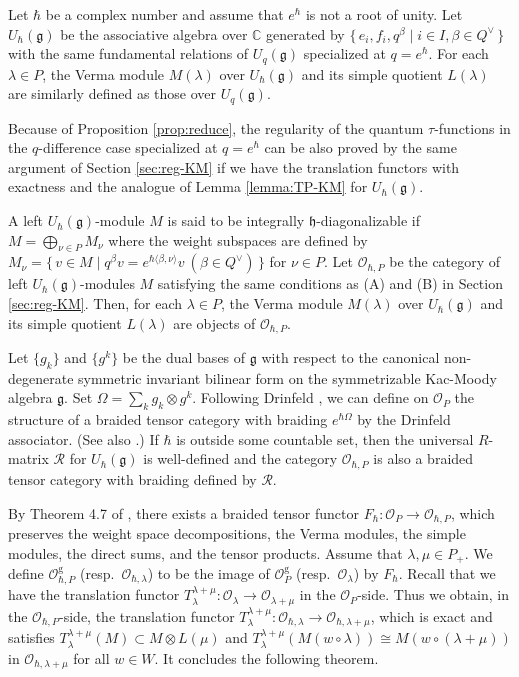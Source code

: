 \documentclass[12pt,twoside]{article}
\newcommand\bra{\langle}
\newcommand\ket{\rangle}
\renewcommand\O{{\mathcal O}}
\newcommand\Qv{Q^\vee}
\newcommand\g{{\mathfrak g}}
\newcommand\h{{\mathfrak h}}
\newcommand\Oh[1]{\O_{\hbar,#1}}
\newcommand\intpart{P}
\newcommand\Oint{\O_\intpart}
\newcommand\Ointh{\O_{\hbar,\intpart}}
\newcommand\Ointg{\Oint^{\mathrm{g}}}
\newcommand\Ointhg{\Ointh^{\mathrm{g}}}
\newcommand\C{{\mathbb C}} %
\theoremstyle{plain} %
\theoremstyle{definition} %
\theoremstyle{definition} %
\numberwithin{theorem}{section}
\numberwithin{equation}{section}
\numberwithin{figure}{section}
\numberwithin{table}{section}
\newcommand\secref[1]{Section \ref{#1}}
\newcommand\propref[1]{Proposition \ref{#1}}
\newcommand\lemmaref[1]{Lemma \ref{#1}}
\begin{document}
Let $\hbar$ be a complex number and 
assume that  $e^\hbar$ is not a root of unity.
Let $U_\hbar(\g)$ be the associative algebra over $\C$ generated by 
$\{\,e_i,f_i,q^\beta\mid i\in I, \beta\in\Qv \,\}$ with the same fundamental
relations of $U_q(\g)$ specialized at $q=e^\hbar$. 
For each $\lambda\in P$, the Verma module $M(\lambda)$ over $U_\hbar(\g)$ and 
its simple quotient $L(\lambda)$ are similarly defined as those over $U_q(\g)$.
 
Because of \propref{prop:reduce},
the regularity of the quantum $\tau$-functions in the $q$-difference case
specialized at $q=e^\hbar$  
can be also proved by the same argument of \secref{sec:reg-KM} 
if we have the translation functors with exactness
and the analogue of \lemmaref{lemma:TP-KM} for $U_\hbar(\g)$.

A left $U_\hbar(\g)$-module $M$ is said to be integrally $\h$-diagonalizable 
if $M=\bigoplus_{\nu\in P}M_\nu$ where the weight subspaces are defined 
by $M_\nu=\{\,v\in M\mid q^\beta v=e^{\hbar\bra\beta,\nu\ket}v\ (\beta\in\Qv) \,\}$
for $\nu\in P$.
Let $\Ointh$ be the category of left $U_\hbar(\g)$-modules $M$ satisfying 
the same conditions as (A) and (B) in \secref{sec:reg-KM}.
Then, for each $\lambda\in P$, the Verma module $M(\lambda)$ over $U_\hbar(\g)$ 
and its simple quotient $L(\lambda)$ are objects of $\Ointh$.

Let $\{g_k\}$ and $\{g^k\}$ be the dual bases of $\g$ with respect to 
the canonical non-degenerate symmetric invariant bilinear form
on the symmetrizable Kac-Moody algebra $\g$.
Set $\Omega = \sum_k g_k\otimes g^k$. 
Following Drinfeld \cite{Drinfeld}, we can define on $\Oint$ the structure 
of a braided tensor category with braiding $e^{\hbar\Omega}$ by 
the Drinfeld associator.
(See also \cite{EK-I}.)
If $\hbar$ is outside some countable set, then 
the universal $R$-matrix $\mathcal{R}$ for $U_\hbar(\g)$ is well-defined and 
the category $\Ointh$ is also a braided tensor category with 
braiding defined by $\mathcal{R}$.

By Theorem 4.7 of \cite{EK-VI}, 
there exists a braided tensor functor $F_\hbar:\Oint\to\Ointh$,
which preserves 
the weight space decompositions,
the Verma modules, 
the simple modules,
the direct sums, 
and the tensor products.
Assume that $\lambda,\mu\in P_+$.
We define $\Ointhg$ (resp.\ $\Oh{\lambda}$) to be
the image of $\Ointg$ (resp.\ $\O_\lambda$) by $F_\hbar$.
Recall that we have the translation functor 
$T_\lambda^{\lambda+\mu}:\O_\lambda\to\O_{\lambda+\mu}$
in the $\Oint$-side.
Thus we obtain, in the $\Ointh$-side, the translation functor
$T_\lambda^{\lambda+\mu}:\Oh{\lambda}\to\Oh{\lambda+\mu}$, 
which is exact and satisfies $T_\lambda^{\lambda+\mu}(M)\subset M\otimes L(\mu)$ 
and $T_\lambda^{\lambda+\mu}(M(w\circ\lambda))\cong M(w\circ(\lambda+\mu))$
in $\Oh{\lambda+\mu}$ for all $w\in W$.
It concludes the following theorem.
\end{document}
